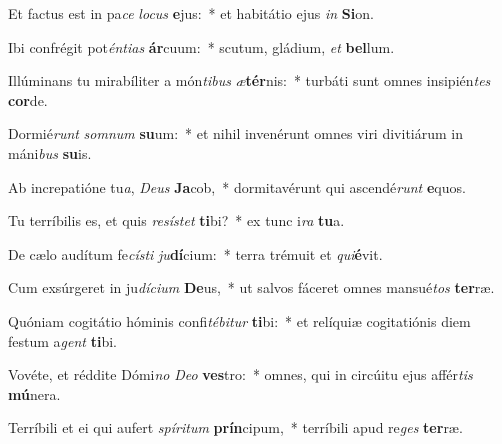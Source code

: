 \item Et factus est in pa\textit{ce} \textit{lo}\textit{cus} \textbf{e}jus:~* et habitátio ejus \textit{in} \textbf{Si}on.
\item Ibi confrégit pot\textit{én}\textit{ti}\textit{as} \textbf{ár}cuum:~* scutum, gládium, \textit{et} \textbf{bel}lum.
\item Illúminans tu mirabíliter a món\textit{ti}\textit{bus} \textit{æ}\textbf{tér}nis:~* turbáti sunt omnes insipién\textit{tes} \textbf{cor}de.
\item Dormié\textit{runt} \textit{som}\textit{num} \textbf{su}um:~* et nihil invenérunt omnes viri divitiárum in máni\textit{bus} \textbf{su}is.
\item Ab increpatióne tu\textit{a}, \textit{De}\textit{us} \textbf{Ja}cob,~* dormitavérunt qui ascendé\textit{runt} \textbf{e}quos.
\item Tu terríbilis es, et quis \textit{re}\textit{sís}\textit{tet} \textbf{ti}bi?~* ex tunc i\textit{ra} \textbf{tu}a.
\item De cælo audítum fe\textit{cís}\textit{ti} \textit{ju}\textbf{dí}cium:~* terra trémuit et \textit{qui}\textbf{é}vit.
\item Cum exsúrgeret in ju\textit{dí}\textit{ci}\textit{um} \textbf{De}us,~* ut salvos fáceret omnes mansué\textit{tos} \textbf{ter}ræ.
\item Quóniam cogitátio hóminis confi\textit{té}\textit{bi}\textit{tur} \textbf{ti}bi:~* et relíquiæ cogitatiónis diem festum a\textit{gent} \textbf{ti}bi.
\item Vovéte, et réddite Dómi\textit{no} \textit{De}\textit{o} \textbf{ves}tro:~* omnes, qui in circúitu ejus affér\textit{tis} \textbf{mú}nera.
\item Terríbili et ei qui aufert \textit{spí}\textit{ri}\textit{tum} \textbf{prín}cipum,~* terríbili apud re\textit{ges} \textbf{ter}ræ.
